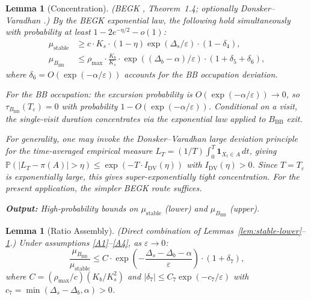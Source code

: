 \documentclass[11pt]{article}
\newtheorem{lemma}[theorem]{Lemma}
\newcommand{\eps}{\varepsilon}
\newcommand{\Ds}{\Delta_s}
\newcommand{\Db}{\Delta_b}
\newcommand{\BBB}{B_{\mathrm{BB}}}
\newcommand{\Teps}{T_\eps}
\newcommand{\muBB}{\mu_{\BBB}}
\begin{document}
\begin{lemma}[Concentration]\label{lem:concentration}
\textnormal{(BEGK \cite{BEGK02}, Theorem~1.4; optionally
Donsker--Varadhan \cite{DV75-83}.)}
By the BEGK exponential law, the following hold simultaneously with
probability at least $1 - 2e^{-\eta/2} - o(1)$:
\begin{align}
  \mu_{\mathrm{stable}}
  &\geq c \cdot K_s \cdot (1-\eta) \exp(\Ds/\eps)
    \cdot (1 - \delta_4),
    \label{eq:conc-stable} \\
  \muBB
  &\leq \rho_{\max} \cdot \frac{K_b}{K_s}
    \cdot \exp((\Db - \alpha)/\eps)
    \cdot (1 + \delta_5 + \delta_6),
    \label{eq:conc-bb}
\end{align}
where $\delta_6 = O(\exp(-\alpha/\eps))$ accounts for the
BB occupation deviation.

For the BB occupation: the excursion probability is
$O(\exp(-\alpha/\eps)) \to 0$, so $\tau_{\BBB}(\Teps) = 0$ with
probability $1 - O(\exp(-\alpha/\eps))$.  Conditional on a visit,
the single-visit duration concentrates via the exponential law
applied to $\BBB$ exit.

For generality, one may invoke the Donsker--Varadhan large deviation
principle for the time-averaged empirical measure
$L_T = (1/T)\int_0^T \mathbf{1}_{X_t \in A}\, dt$, giving
$\mathbb{P}(|L_T - \pi(A)| > \eta)
\leq \exp(-T \cdot I_{\mathrm{DV}}(\eta))$
with $I_{\mathrm{DV}}(\eta) > 0$.  Since
$T = \Teps$ is exponentially large, this gives super-exponentially
tight concentration.  For the present application, the simpler
BEGK route suffices.

\medskip\noindent
\textbf{Output:} High-probability bounds on
$\mu_{\mathrm{stable}}$ (lower) and $\muBB$ (upper).
\end{lemma}

\begin{lemma}[Ratio Assembly]\label{lem:ratio}
\textnormal{(Direct combination of
Lemmas~\ref{lem:stable-lower}--\ref{lem:concentration}.)}
Under assumptions \ref{A1}--\ref{A4}, as $\eps \to 0$:
\begin{equation}\label{eq:ratio}
  \frac{\muBB}{\mu_{\mathrm{stable}}}
  \leq C \cdot \exp\!\left(
    -\frac{\Ds - \Db - \alpha}{\eps}
  \right)
  \cdot (1 + \delta_7),
\end{equation}
where $C = (\rho_{\max}/c)(K_b/K_s^2)$ and
$|\delta_7| \leq C_7 \exp(-c_7/\eps)$ with
$c_7 = \min(\Ds - \Db, \alpha) > 0$.
\end{lemma}
\end{document}
